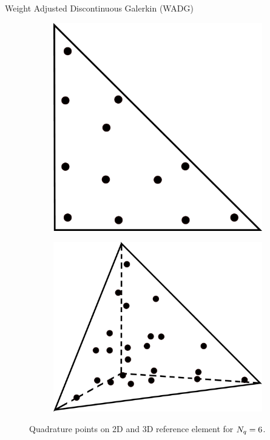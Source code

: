 \begin{frame}{Weight Adjusted Discontinuous Galerkin (WADG)}
  \begin{figure}[!htbp]
    \begin{subfigure}{0.45\textwidth}
      \centering
      \includegraphics[scale=0.07]{image/quad_2d.pdf}
    \end{subfigure}
    \begin{subfigure}{0.45\textwidth}
      \centering
      \includegraphics[scale=0.08]{image/quad_3d.pdf}
    \end{subfigure}
    \caption*{\scriptsize{Quadrature points on 2D and 3D reference element for ${N_q}=6$.}}
    \label{quad_point_sketch}
  \end{figure}


\end{frame}



